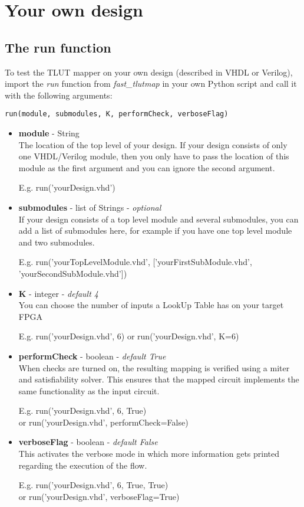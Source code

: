 \documentclass[a4paper,oneside]{memoir}
\begin{document}
\clearpage
\chapter{Your own design}\label{sec:experiment}
\section{The run function}\label{sec:run_function}
To test the TLUT mapper on your own design (described in VHDL or Verilog), import the \emph{run} function from \emph{fast\_tlutmap} in your own Python script and call it with the following arguments:
\begin{lstlisting}
run(module, submodules, K, performCheck, verboseFlag)
\end{lstlisting}
\begin{itemize}
\item \textbf{module} - String\\
The location of the top level of your design. If your design consists of only one VHDL/Verilog module, then you only have to pass the location of this module as the first argument and you can ignore the second argument.

E.g. run('yourDesign.vhd')

\item \textbf{submodules} - list of Strings - \textit{optional}\\
If your design consists of a top level module and several submodules, you can add a list of submodules here, for example if you have one top level module and two submodules.

E.g. run('yourTopLevelModule.vhd', ['yourFirstSubModule.vhd', 'yourSecondSubModule.vhd'])

\item \textbf{K} - integer - \textit{default 4}\\
You can choose the number of inputs a LookUp Table has on your target FPGA

E.g. run('yourDesign.vhd', 6)
or run('yourDesign.vhd', K=6)

\item \textbf{performCheck} - boolean - \textit{default True}\\
When checks are turned on, the resulting mapping is verified using a miter and satisfiability solver. This ensures that the mapped circuit implements the same functionality as the input circuit.

E.g. run('yourDesign.vhd', 6, True)\\
or run('yourDesign.vhd', performCheck=False)

\item \textbf{verboseFlag} - boolean - \textit{default False}\\
This activates the verbose mode in which more information gets printed regarding the execution of the flow.

E.g. run('yourDesign.vhd', 6, True, True)\\ or run('yourDesign.vhd', verboseFlag=True)
\end{itemize}
\end{document}
